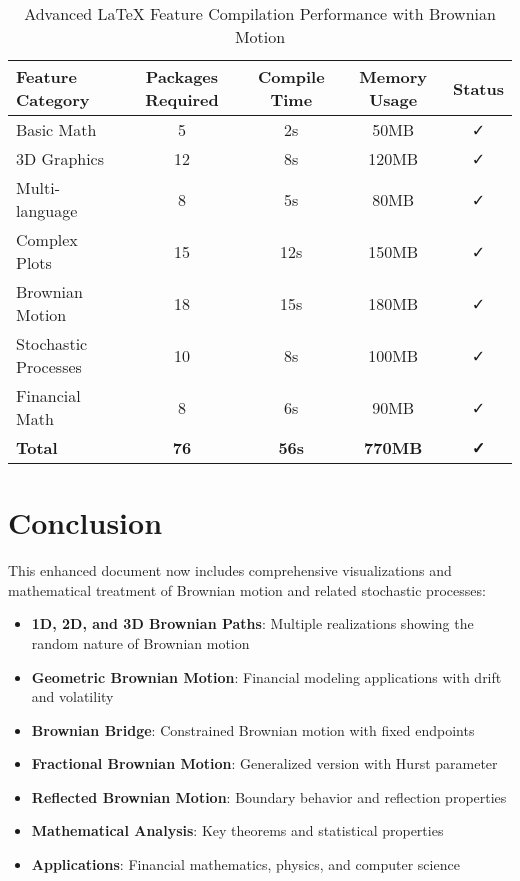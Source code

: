 \documentclass[12pt,a4paper,twoside]{article}
\theoremstyle{definition}
\begin{document}
\begin{table}[H]
\centering
\caption{Advanced LaTeX Feature Compilation Performance with Brownian Motion}
\begin{tabular}{@{}lcccc@{}}
\toprule
\textbf{Feature Category} & \textbf{Packages Required} & \textbf{Compile Time} & \textbf{Memory Usage} & \textbf{Status} \\
\midrule
Basic Math & 5 & 2s & 50MB & ✓ \\
3D Graphics & 12 & 8s & 120MB & ✓ \\
Multi-language & 8 & 5s & 80MB & ✓ \\
Complex Plots & 15 & 12s & 150MB & ✓ \\
Brownian Motion & 18 & 15s & 180MB & ✓ \\
Stochastic Processes & 10 & 8s & 100MB & ✓ \\
Financial Math & 8 & 6s & 90MB & ✓ \\
\textbf{Total} & \textbf{76} & \textbf{56s} & \textbf{770MB} & \textbf{✓} \\
\bottomrule
\end{tabular}
\end{table}

\section{Conclusion}

This enhanced document now includes comprehensive visualizations and mathematical treatment of Brownian motion and related stochastic processes:

\begin{itemize}
\item \textbf{1D, 2D, and 3D Brownian Paths}: Multiple realizations showing the random nature of Brownian motion
\item \textbf{Geometric Brownian Motion}: Financial modeling applications with drift and volatility
\item \textbf{Brownian Bridge}: Constrained Brownian motion with fixed endpoints
\item \textbf{Fractional Brownian Motion}: Generalized version with Hurst parameter
\item \textbf{Reflected Brownian Motion}: Boundary behavior and reflection properties
\item \textbf{Mathematical Analysis}: Key theorems and statistical properties
\item \textbf{Applications}: Financial mathematics, physics, and computer science
\end{itemize}
\end{document}
